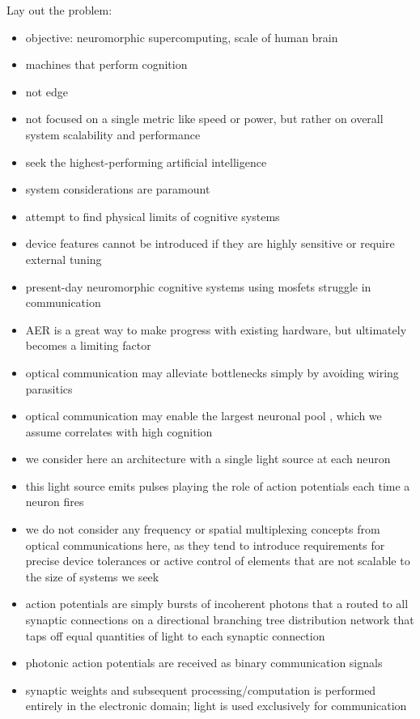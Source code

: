 \documentclass[onecolumn]{article}
\begin{document}
Lay out the problem: 
\begin{itemize}
\item objective: neuromorphic supercomputing, scale of human brain
\item machines that perform cognition
\item not edge
\item not focused on a single metric like speed or power, but rather on overall system scalability and performance
\item seek the highest-performing artificial intelligence
\item system considerations are paramount
\item attempt to find physical limits of cognitive systems
\item device features cannot be introduced if they are highly sensitive or require external tuning
\item present-day neuromorphic cognitive systems using mosfets struggle in communication
\item AER is a great way to make progress with existing hardware, but ultimately becomes a limiting factor
\item optical communication may alleviate bottlenecks simply by avoiding wiring parasitics
\item optical communication may enable the largest neuronal pool \cite{sh2018_ICRC}, which we assume correlates with high cognition
\item we consider here an architecture with a single light source at each neuron
\item this light source emits pulses playing the role of action potentials each time a neuron fires
\item we do not consider any frequency or spatial multiplexing concepts from optical communications here, as they tend to introduce requirements for precise device tolerances or active control of elements that are not scalable to the size of systems we seek
\item action potentials are simply bursts of incoherent photons that a routed to all synaptic connections on a directional branching tree distribution network that taps off equal quantities of light to each synaptic connection
\item photonic action potentials are received as binary communication signals
\item synaptic weights and subsequent processing/computation is performed entirely in the electronic domain; light is used exclusively for communication

\end{itemize}
\end{document}
